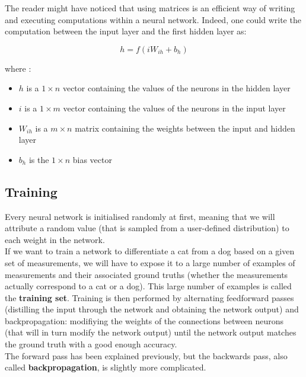The reader might have noticed that using matrices is an efficient way of writing
and executing computations within a neural network. Indeed, one could write
the computation between the input layer and the first hidden layer as: 

$$ h = f(iW_{ih} + b_h) $$

\noindent where : 
\begin{itemize}
	\item $h$ is a $1\times n$ vector containing the values of the neurons 
		in the hidden layer
	\item $i$ is a $1\times m$ vector containing the values of the neurons
		in the input layer
	\item $W_{ih}$ is a $m\times n$ matrix containing the weights between
		the input and hidden layer
	\item $b_h$ is the $1\times n$ bias vector 
\end{itemize}

\subsection{Training}
\label{nn:training}
Every neural network is initialised randomly at first, meaning that we will
attribute a random value (that is sampled from a user-defined distribution)
to each weight in the network.\\

If we want to train a network to differentiate a cat from a dog based on a
given set of measurements, we will have to expose it to a large number of examples
of measurements and their associated ground truths 
(whether the measurements actually correspond to a cat or a dog). This large
number of examples is called the \textbf{training set}. 
Training is
then performed by alternating feedforward passes (distilling the input through
the network and obtaining the network output) and backpropagation: modifiying 
the weights of the connections between neurons (that will in turn modify 
the network output) until the network output matches the ground truth with 
a good enough accuracy.\\

The forward pass has been explained previously, but the backwards pass, also
called \textbf{backpropagation}, is slightly more complicated.\\

